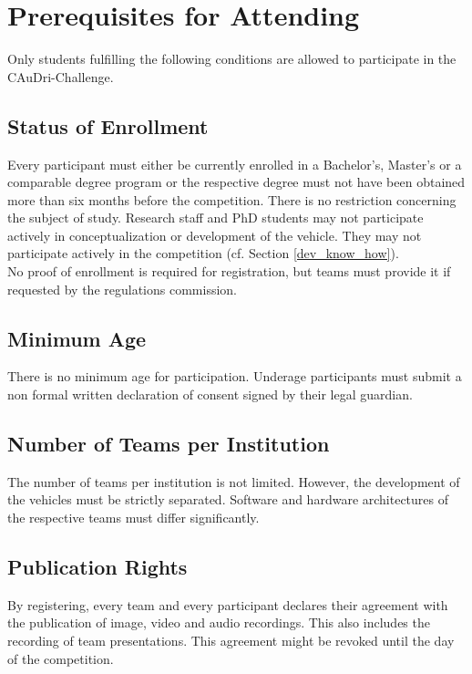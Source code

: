 \chapter{Prerequisites for Attending}

Only students fulfilling the following conditions are allowed to participate in
the CAuDri-Challenge.

\section{Status of Enrollment}

Every participant must either be currently enrolled in a Bachelor’s, Master’s
or a comparable degree program or the respective degree must not have been
obtained more than six months before the competition. There is no restriction
concerning the subject of study. Research staff and PhD students may not
participate actively in conceptualization or development of the vehicle. They
may not participate actively in the competition (cf. Section
\ref{dev_know_how}).\\ No proof of enrollment is required for registration, but
teams must provide it if requested by the regulations commission.

\section{Minimum Age}

There is no minimum age for participation. Underage participants must submit a
non formal written declaration of consent signed by their legal guardian.

\section{Number of Teams per Institution}

The number of teams per institution is not limited. However, the development of
the vehicles must be strictly separated. Software and hardware architectures of
the respective teams must differ significantly.

\section{Publication Rights}

By registering, every team and every participant declares their agreement with
the publication of image, video and audio recordings. This also includes the
recording of team presentations. This agreement might be revoked until the day
of the competition.
